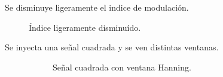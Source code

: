     Se disminuye ligeramente el indice de modulación.

      \begin{figure}[H]
        \centering
          \caption{Índice ligeramente disminuído.}
          \label{fig:Exp6SeñalFMIndiceDisminuido}
      \end{figure}
    
    Se inyecta una señal cuadrada y se ven distintas ventanas.

      \begin{figure}[H]
        \centering
        \begin{subfigure}[H]{0.48\textwidth}
          \caption{Señal cuadrada con ventana Hanning.}
          \label{fig:Exp6SeñalFMModulanteCuadradaHanning}
        \end{subfigure}
        \hfill 
        \begin{subfigure}[H]{0.48\textwidth}

\end{subfigure}
\end{figure}
